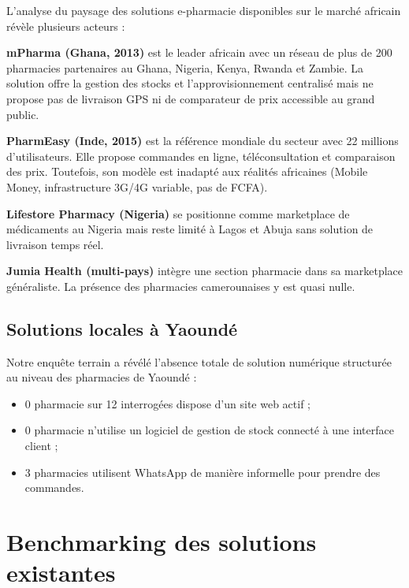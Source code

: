\documentclass[12pt,a4paper,oneside]{report}
\begin{document}
L'analyse du paysage des solutions e-pharmacie disponibles sur le marché africain révèle plusieurs acteurs :

\textbf{mPharma (Ghana, 2013)} est le leader africain avec un réseau de plus de 200 pharmacies partenaires au Ghana, Nigeria, Kenya, Rwanda et Zambie. La solution offre la gestion des stocks et l'approvisionnement centralisé mais ne propose pas de livraison GPS ni de comparateur de prix accessible au grand public.

\textbf{PharmEasy (Inde, 2015)} est la référence mondiale du secteur avec 22 millions d'utilisateurs. Elle propose commandes en ligne, téléconsultation et comparaison des prix. Toutefois, son modèle est inadapté aux réalités africaines (Mobile Money, infrastructure 3G/4G variable, pas de FCFA).

\textbf{Lifestore Pharmacy (Nigeria)} se positionne comme marketplace de médicaments au Nigeria mais reste limité à Lagos et Abuja sans solution de livraison temps réel.

\textbf{Jumia Health (multi-pays)} intègre une section pharmacie dans sa marketplace généraliste. La présence des pharmacies camerounaises y est quasi nulle.

\subsection{Solutions locales à Yaoundé}

Notre enquête terrain a révélé l'absence totale de solution numérique structurée au niveau des pharmacies de Yaoundé :
\begin{itemize}
  \item 0 pharmacie sur 12 interrogées dispose d'un site web actif ;
  \item 0 pharmacie n'utilise un logiciel de gestion de stock connecté à une interface client ;
  \item 3 pharmacies utilisent WhatsApp de manière informelle pour prendre des commandes.
\end{itemize}

\section{Benchmarking des solutions existantes}
\end{document}

